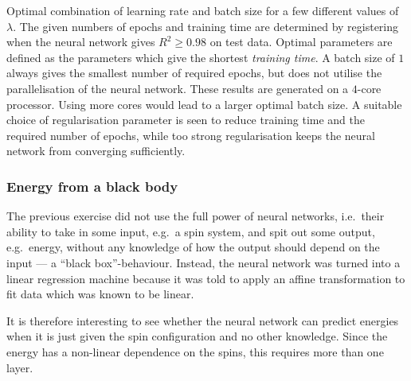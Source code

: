 \documentclass[11pt,british,a4paper]{article}
\numberwithin{equation}{section}
\begin{document}
\begin{table}[H]
    \centering
    \caption{Optimal combination of learning rate and batch size for a few different values of \(\lambda\). The given numbers of epochs and training time are determined by registering when the neural network gives \(R^2\geq \num{0.98}\) on test data. Optimal parameters are defined as the parameters which give the shortest \emph{training time}. A batch size of \(1\) always gives the smallest number of required epochs, but does not utilise the parallelisation of the neural network. These results are generated on a \(4\)-core processor. Using more cores would lead to a larger optimal batch size. A suitable choice of regularisation parameter is seen to reduce training time and the required number of epochs, while too strong regularisation keeps the neural network from converging sufficiently.}
\end{table}

\subsubsection{Energy from a black body}
The previous exercise did not use the full power of neural networks, i.e.\ their ability to take in some input, e.g.\ a spin system, and spit out some output, e.g.\ energy, without any knowledge of how the output should depend on the input --- a ``black box''-behaviour. Instead, the neural network was turned into a linear regression machine because it was told to apply an affine transformation to fit data which was known to be linear.

It is therefore interesting to see whether the neural network can predict energies when it is just given the spin configuration and no other knowledge. Since the energy has a non-linear dependence on the spins, this requires more than one layer.


\clearpage
\appendix
\end{document}
